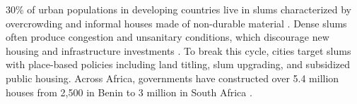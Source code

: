 \documentclass[12pt]{article}
\begin{document}





30\% of urban populations in developing countries live in slums characterized by overcrowding and informal houses made of non-durable material \citep{mdg}.  Dense slums often produce congestion and unsanitary conditions, which discourage new housing and infrastructure investments \citep{marx2013slums}.  To break this cycle, cities target slums with place-based policies including land titling, slum upgrading, and subsidized public housing.  Across Africa, governments have constructed over 5.4 million houses from 2,500 in Benin to 3 million in South Africa \citep{bah2018housing}.  
\end{document}

